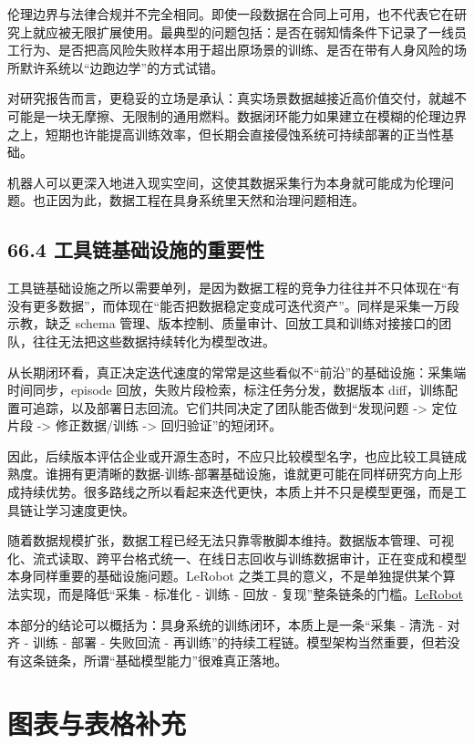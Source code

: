 伦理边界与法律合规并不完全相同。即使一段数据在合同上可用，也不代表它在研究上就应被无限扩展使用。最典型的问题包括：是否在弱知情条件下记录了一线员工行为、是否把高风险失败样本用于超出原场景的训练、是否在带有人身风险的场所默许系统以“边跑边学”的方式试错。

对研究报告而言，更稳妥的立场是承认：真实场景数据越接近高价值交付，就越不可能是一块无摩擦、无限制的通用燃料。数据闭环能力如果建立在模糊的伦理边界之上，短期也许能提高训练效率，但长期会直接侵蚀系统可持续部署的正当性基础。

机器人可以更深入地进入现实空间，这使其数据采集行为本身就可能成为伦理问题。也正因为此，数据工程在具身系统里天然和治理问题相连。

\subsection*{66.4 工具链基础设施的重要性}


工具链基础设施之所以需要单列，是因为数据工程的竞争力往往并不只体现在“有没有更多数据”，而体现在“能否把数据稳定变成可迭代资产”。同样是采集一万段示教，缺乏 schema 管理、版本控制、质量审计、回放工具和训练对接接口的团队，往往无法把这些数据持续转化为模型改进。

从长期闭环看，真正决定迭代速度的常常是这些看似不“前沿”的基础设施：采集端时间同步，episode 回放，失败片段检索，标注任务分发，数据版本 diff，训练配置可追踪，以及部署日志回流。它们共同决定了团队能否做到“发现问题 -> 定位片段 -> 修正数据/训练 -> 回归验证”的短闭环。

因此，后续版本评估企业或开源生态时，不应只比较模型名字，也应比较工具链成熟度。谁拥有更清晰的数据-训练-部署基础设施，谁就更可能在同样研究方向上形成持续优势。很多路线之所以看起来迭代更快，本质上并不只是模型更强，而是工具链让学习速度更快。

随着数据规模扩张，数据工程已经无法只靠零散脚本维持。数据版本管理、可视化、流式读取、跨平台格式统一、在线日志回收与训练数据审计，正在变成和模型本身同样重要的基础设施问题。LeRobot 之类工具的意义，不是单独提供某个算法实现，而是降低“采集 - 标准化 - 训练 - 回放 - 复现”整条链条的门槛。\href{https://arxiv.org/abs/2602.22818}{LeRobot}

本部分的结论可以概括为：具身系统的训练闭环，本质上是一条“采集 - 清洗 - 对齐 - 训练 - 部署 - 失败回流 - 再训练”的持续工程链。模型架构当然重要，但若没有这条链条，所谓“基础模型能力”很难真正落地。

\section*{图表与表格补充}

